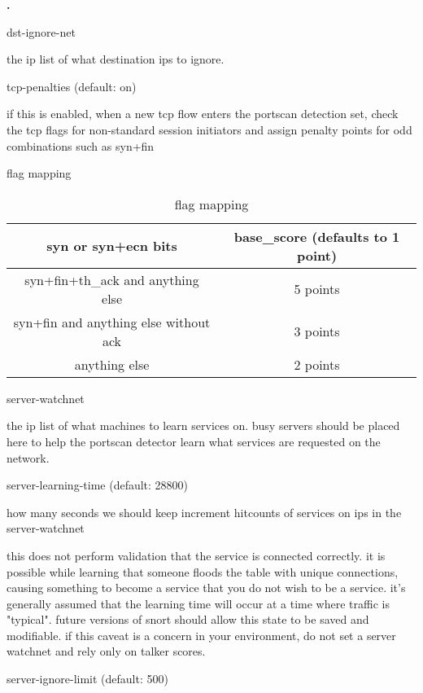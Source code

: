 \documentclass[english]{report}
\newcounter{slistnum}
\newenvironment{slist}{
    \begin{list}{
        {
            \bf \arabic{slistnum}.
        } 
    }{
        \usecounter{slistnum} 
    }
}{
    \end{list} 
}
\begin{document}
\begin{slist}
\item dst-ignore-net  

the ip list of what destination ips to ignore.

\item tcp-penalties (default: on)

if this is enabled, when a new tcp flow enters the portscan detection set,
check the tcp flags for non-standard session initiators and assign penalty
points for odd combinations such as syn+fin

\item flag mapping

\begin{table}[!hbpt]
\caption{flag mapping}
\begin{center}\begin{tabular}{|c|c|}
\hline 
syn or syn+ecn bits &
base\_score (defaults to 1 point) \\
\hline
\hline 
syn+fin+th\_ack and anything else & 5 points \\
\hline 
syn+fin and anything else without ack & 3 points \\
\hline 
anything else & 2 points \\
\hline
\end{tabular}\end{center}
\end{table}


\item server-watchnet 

the ip list of what machines to learn services on.  busy servers should be
placed here to help the portscan detector learn what services are requested on
the network.

\item server-learning-time (default: 28800)

how many seconds we should keep increment hitcounts of services on ips in the
server-watchnet

this does not perform validation that the service is connected correctly. it is
possible while learning that someone floods the table with unique connections,
causing something to become a service that you do not wish to be a service.
it's generally assumed that the learning time will occur at a time where
traffic is "typical". future versions of snort should allow this state to be
saved and modifiable.  if this caveat is a concern in your environment, do not
set a server watchnet and rely only on talker scores.

\item server-ignore-limit (default: 500)


\end{slist}
\end{document}
